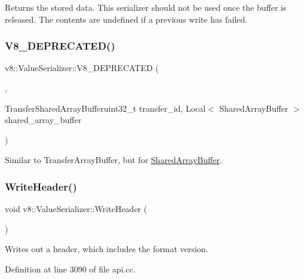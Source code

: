Returns the stored data. This serializer should not be used once the buffer is released. The contents are undefined if a previous write has failed. \mbox{\label{classv8_1_1ValueSerializer_a4f7e5fe4298a8094817fe9f639112499}} 
\subsubsection{\texorpdfstring{V8\+\_\+\+D\+E\+P\+R\+E\+C\+A\+T\+E\+D()}{V8\_DEPRECATED()}\hspace{0.1cm}{\footnotesize\ttfamily [2/2]}}
{\footnotesize\ttfamily v8\+::\+Value\+Serializer\+::\+V8\+\_\+\+D\+E\+P\+R\+E\+C\+A\+T\+ED (\begin{DoxyParamCaption}\item[{\char`\"{}Use \mbox{\hyperlink{classv8_1_1ValueSerializer_1_1Delegate_ac12b5cfd7480c19f0b9af0b47d05a77e}{Delegate\+::\+Get\+Shared\+Array\+Buffer\+Id}}\char`\"{}}]{,  }\item[{void }]{Transfer\+Shared\+Array\+Bufferuint32\+\_\+t transfer\+\_\+id, Local$<$ Shared\+Array\+Buffer $>$ shared\+\_\+array\+\_\+buffer }\end{DoxyParamCaption})}

Similar to Transfer\+Array\+Buffer, but for \mbox{\hyperlink{classv8_1_1SharedArrayBuffer}{Shared\+Array\+Buffer}}. \mbox{\label{classv8_1_1ValueSerializer_ac0bdf1a7731ee4e93823dabdfa8c8661}} 
\subsubsection{\texorpdfstring{Write\+Header()}{WriteHeader()}}
{\footnotesize\ttfamily void v8\+::\+Value\+Serializer\+::\+Write\+Header (\begin{DoxyParamCaption}{ }\end{DoxyParamCaption})}

Writes out a header, which includes the format version. 

Definition at line 3090 of file api.\+cc.

